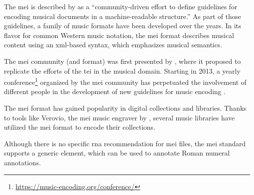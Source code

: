 

The \gls{mei} is described by \textcite{hankinson2011music}
as a ``community-driven effort to define guidelines for
encoding musical documents in a machine-readable
structure.'' As part of those guidelines, a family of music
formats have been developed over the years. In its flavor
for common Western music notation, the \gls{mei} format
describes musical content using an \gls{xml}-based syntax,
which emphasizes musical semantics.


The \gls{mei} community (and format) was first presented by
\textcite{roland2002music}, where it proposed to replicate
the efforts of the \gls{tei} in the musical domain. Starting
in 2013, a yearly
conference\footnote{\href{https://music-encoding.org/conference/}{https://music-encoding.org/conference/}}
organized by the \gls{mei} community has perpetuated the
involvement of different people in the development of new
guidelines for music encoding
\parencite{crawford2016review}.


The \gls{mei} format has gained popularity in digital
collections and libraries. Thanks to tools like Verovio, the
\gls{mei} music engraver by \textcite{pugin2014verovio},
several music libraries have utilized the \gls{mei} format
to encode their collections.


Although there is no specific \gls{rna} recommendation for \gls{mei} files, the \gls{mei} standard supports a generic  element, which can be used to annotate Roman numeral annotations.
